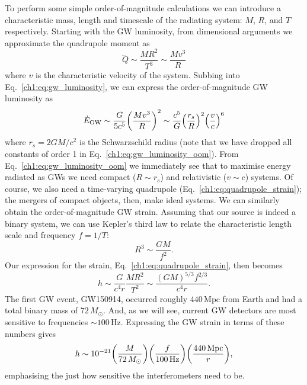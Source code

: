 To perform some simple order-of-magnitude calculations we can introduce a characteristic mass, length and timescale of the radiating system: $M$, $R$, and $T$ respectively.
Starting with the GW luminosity, from dimensional arguments we approximate the quadrupole moment as 
\begin{equation}
    \dddot{Q} \sim \frac{MR^2}{T^3} \sim \frac{Mv^3}{R}
\end{equation}
where $v$ is the characteristic velocity of the system.
Subbing into Eq.~\ref{ch1:eq:gw_luminosity}, we can express the order-of-magnitude GW luminosity as
\begin{equation}\label{ch1:eq:gw_luminosity_oom}
    \dot{E}_\mathrm{GW} \sim \frac{G}{5c^5} \qty(\frac{Mv^3}{R})^2 \sim \frac{c^5}{G} \qty(\frac{r_s}{R})^2 \qty(\frac{v}{c})^6
\end{equation}
where $r_s = 2GM/c^2$ is the Schwarzschild radius (note that we have dropped all constants of order 1 in Eq.~\ref{ch1:eq:gw_luminosity_oom}).
From Eq.~\ref{ch1:eq:gw_luminosity_oom} we immediately see that to maximise energy radiated as GWs we need compact ($R \sim r_s$) and relativistic ($v \sim c$) systems.
Of course, we also need a time-varying quadrupole (Eq.~\ref{ch1:eq:quadrupole_strain}); the mergers of compact objects, then, make ideal systems.
We can similarly obtain the order-of-magnitude GW strain. 
Assuming that our source is indeed a binary system, we can use Kepler's third law to relate the characteristic length scale and frequency $f = 1/T$:
\begin{equation}
    R^3 \sim \frac{GM}{f^2}.
\end{equation}
Our expression for the strain, Eq.~\ref{ch1:eq:quadrupole_strain}, then becomes
\begin{equation}
    h \sim \frac{G}{c^4 r} \frac{MR^2}{T^2} \sim \frac{(GM)^{5/3}f^{2/3}}{c^4 r}.
\end{equation}
The first GW event, GW150914, occurred roughly $440\,\mathrm{Mpc}$ from Earth and had a total binary mass of $72\,M_\odot$.
And, as we will see, current GW detectors are most sensitive to frequencies $\sim 100\,\mathrm{Hz}$.
Expressing the GW strain in terms of these numbers gives
\begin{equation}\label{ch1:eq:quadrupole_strain_oom}
    h \sim 10^{-21} \qty(\frac{M}{72\,M_\odot}) \qty(\frac{f}{100\,\mathrm{Hz}}) \qty(\frac{440\,\mathrm{Mpc}}{r}),
\end{equation}
emphasising the just how sensitive the interferometers need to be.

